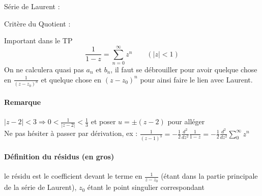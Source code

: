 Série de Laurent : \begin{center}
\end{center}
Critère du Quotient : \begin{center}
\end{center}
Important dans le TP $$\frac{1}{1-z}=\sum_{n=0}^\infty z^n\qquad (|z|<1)$$
On ne calculera quasi pas $a_n$ et $b_n$, il faut se débrouiller pour avoir quelque chose en $\frac{1}{(z-z_0)^n}$ et quelque chose en $(z-z_0)^n$ pour ainsi faire le lien avec Laurent.
\paragraph{Remarque } $|z-2|< 3 \Rightarrow 0<\frac{1}{|z-2|}<\frac{1}{3}$ et poser $u=\pm(z-2)$ pour alléger\\
Ne pas hésiter à passer par dérivation, ex : $\frac{1}{(z-1)^3}=-\frac{1}{2}\frac{d^2}{dz^2}\frac{1}{1-z}=-\frac{1}{2}\frac{d^2}{dz^2}\sum_0^\infty z^n$
\paragraph{Définition du résidus (en gros)} le résidu est le coefficient devant le terme en $\frac{1}{z-z_0}$ 	(étant dans la partie principale de la série de Laurent), $z_0$  étant le point singulier correspondant

